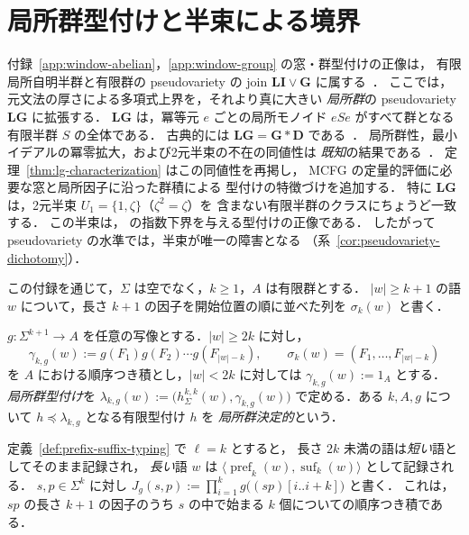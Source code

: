 \section{局所群型付けと半束による境界}
\label{app:local-group}

付録~\ref{app:window-abelian}，\ref{app:window-group} の窓・群型付けの正像は，
有限局所自明半群と有限群の pseudovariety の join $\mathbf{LI}\vee\mathbf{G}$ に属する~\cite[Lemma~7.4]{kuriyamaCFG}．
ここでは，元文法の厚さによる多項式上界を，それより真に大きい
\emph{局所群}の pseudovariety $\mathbf{LG}$ に拡張する．
$\mathbf{LG}$ は，冪等元 $e$ ごとの局所モノイド $eSe$ がすべて群となる有限半群 $S$ の全体である．
古典的には $\mathbf{LG}=\mathbf G*\mathbf D$ である~\cite{Straubing1985,Tilson1987}．
局所群性，最小イデアルの冪零拡大，および2元半束の不在の同値性は
\emph{既知}の結果である~\cite[Proposition~2.3]{AlmeidaEtAl2009}．
定理~\ref{thm:lg-characterization} はこの同値性を再掲し，
MCFG の定量的評価に必要な窓と局所因子に沿った群積による
型付けの特徴づけを追加する．
特に $\mathbf{LG}$ は，2元半束 $U_1=\{1,\zeta\}$（$\zeta^2=\zeta$）を
含まない有限半群のクラスにちょうど一致する．
この半束は，\cite{kuriyamaCFG} の指数下界を与える型付けの正像である．
したがって pseudovariety の水準では，半束が唯一の障害となる
（系~\ref{cor:pseudovariety-dichotomy}）．

この付録を通じて，$\Sigma$ は空でなく，$k\ge1$，$A$ は有限群とする．
$|w|\ge k+1$ の語 $w$ について，長さ $k+1$ の因子を開始位置の順に並べた列を $\sigma_k(w)$ と書く．

\begin{definition}[局所群型付け]
\label{def:local-group-typing}
$g:\Sigma^{k+1}\to A$ を任意の写像とする．$|w|\ge2k$ に対し，
\[
 \gamma_{k,g}(w):=g(F_1)g(F_2)\cdots g(F_{|w|-k}),
 \qquad \sigma_k(w)=(F_1,\ldots,F_{|w|-k})
\]
を $A$ における順序つき積とし，$|w|<2k$ に対しては $\gamma_{k,g}(w):=1_A$ とする．
\emph{局所群型付け}を
\(\lambda_{k,g}(w):=\bigl(h^{k,k}_\Sigma(w),\gamma_{k,g}(w)\bigr)\)
で定める．ある $k,A,g$ について $h\preceq\lambda_{k,g}$ となる有限型付け $h$ を
\emph{局所群決定的}という．
\end{definition}

定義~\ref{def:prefix-suffix-typing} で $\ell=k$ とすると，
長さ $2k$ 未満の語は\emph{短い}語としてそのまま記録され，
\emph{長い}語 $w$ は $\langle\operatorname{pref}_k(w),\operatorname{suf}_k(w)\rangle$ として記録される．
$s,p\in\Sigma^k$ に対し
$J_g(s,p):=\prod_{i=1}^{k}g\bigl((sp)[i..i+k]\bigr)$ と書く．
これは，$sp$ の長さ $k+1$ の因子のうち $s$ の中で始まる $k$ 個についての順序つき積である．

